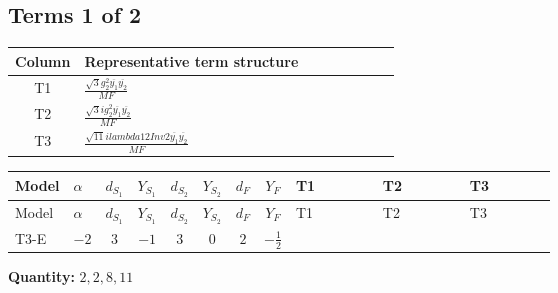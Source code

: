\documentclass[8pt]{article}
\begin{document}
\begin{landscape}
\subsection*{Terms 1 of 2}
\begin{center}
\begin{tabular}{@{}c >{\raggedright\arraybackslash}p{0.82\linewidth}@{}}
\toprule
Column & Representative term structure \\
\midrule
T1 & \(\displaystyle \frac{\sqrt{3} g_{2}^{2} \overline{y_{1}} \overline{y_{2}}}{MF}\) \\
\midrule
T2 & \(\displaystyle \frac{\sqrt{3} i g_{2}^{2} \overline{y_{1}} \overline{y_{2}}}{MF}\) \\
\midrule
T3 & \(\displaystyle \frac{\sqrt{11} i lambda12Inv2 \overline{y_{1}} \overline{y_{2}}}{MF}\) \\
\midrule
\bottomrule
\end{tabular}
\end{center}
\smallskip
\tiny
\begin{longtable}{@{}llcccccc >{\raggedright\arraybackslash}p{0.21\linewidth} >{\raggedright\arraybackslash}p{0.21\linewidth} >{\raggedright\arraybackslash}p{0.21\linewidth}@{}}
\toprule
Model & $\alpha$ & $d_{S_1}$ & $Y_{S_1}$ & $d_{S_2}$ & $Y_{S_2}$ & $d_F$ & $Y_F$ & T1 & T2 & T3 \\
\midrule
\endfirsthead
\toprule
Model & $\alpha$ & $d_{S_1}$ & $Y_{S_1}$ & $d_{S_2}$ & $Y_{S_2}$ & $d_F$ & $Y_F$ & T1 & T2 & T3 \\
\midrule
\endhead
T3-E & $-2$ & $3$ & $-1$ & $3$ & $0$ & $2$ & $-\frac{1}{2}$ & \scriptsize\adjustbox{max width=\linewidth}{$\begin{gathered} - \frac{\sqrt{3} g_{2}^{2} \overline{y_{1}} \overline{y_{2}}}{6 MF}\end{gathered}$} & \scriptsize\adjustbox{max width=\linewidth}{$\begin{gathered} - \frac{11 \sqrt{3} i g_{2}^{2} \overline{y_{1}} \overline{y_{2}}}{8 MF}\end{gathered}$} & \scriptsize\adjustbox{max width=\linewidth}{$\begin{gathered} - \frac{3 \sqrt{11} i lambda12Inv2 \overline{y_{1}} \overline{y_{2}}}{22 MF}\end{gathered}$} \\
\midrule
\bottomrule
\end{longtable}
\clearpage
\noindent\textbf{Quantity: }$\mathrm{2,2,8,11}$\par\smallskip

\end{landscape}
\end{document}
